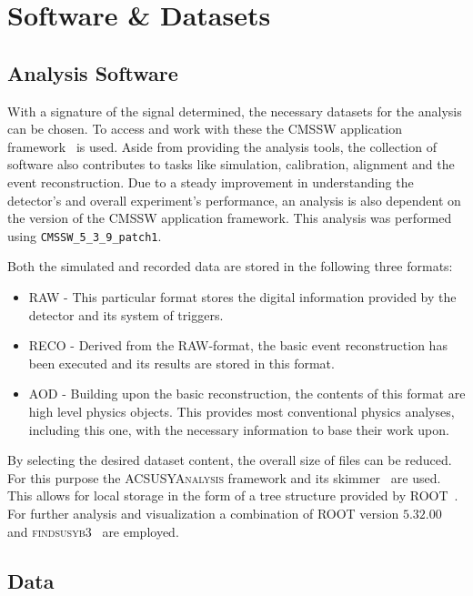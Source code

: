\chapter{Software \& Datasets}
\label{cha:datasets}

\section{Analysis Software}

With a signature of the signal determined, the necessary datasets for the analysis can be chosen. To access and work with these the \textsc{CMSSW} application framework~\cite{cmssw} is used. Aside from providing the analysis tools, the collection of software also contributes to tasks like simulation, calibration, alignment and the event reconstruction. Due to a steady improvement in understanding the detector's and overall experiment's performance, an analysis is also dependent on the version of the \textsc{CMSSW} application framework. This analysis was performed using \verb+CMSSW_5_3_9_patch1+.

Both the simulated and recorded data are stored in the following three formats:

\begin{itemize}
\item \textsc{RAW} - This particular format stores the digital information provided by the detector and its system of triggers.
\item \textsc{RECO} - Derived from the \textsc{RAW}-format, the basic event reconstruction has been executed and its results are stored in this format.
\item \textsc{AOD} - Building upon the basic reconstruction, the contents of this format are high level physics objects. This provides most conventional physics analyses, including this one, with the necessary information to base their work upon.
\end{itemize}

By selecting the desired dataset content, the overall size of files can be reduced. For this purpose the \textsc{ACSUSYAnalysis} framework and its skimmer~\cite{acsusyana} are used. This allows for local storage in the form of a tree structure provided by \textsc{ROOT}~\cite{root}. For further analysis and visualization a combination of \textsc{ROOT} version $5.32.00$ and \textsc{findsusyb3}~\cite{findsusyb3} are employed. 


\section{Data}

